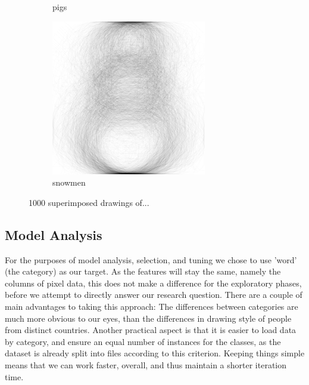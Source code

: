 \documentclass[a4paper, twocolumn]{article}
\begin{document}
\begin{figure}[H]
\begin{subfigure}{.33\columnwidth}
      \caption{pigs}
      \label{fig:pigs}
    \end{subfigure}%
    \begin{subfigure}{.33\columnwidth}
      \centering
      \includegraphics[width=.9\textwidth]{figures/snowman.png}
      \caption{snowmen}
      \label{fig:snowmen}
    \end{subfigure}
    \caption{1000 superimposed drawings of...}
    \label{fig:superimposed}
    \end{figure}

\subsection{Model Analysis\label{sec:Model Analysis}}
For the purposes of model analysis, selection, and tuning we chose to use 'word' (the category) as our target. As the features will stay the same, namely the columns of pixel data, this does not make a difference for the exploratory phases, before we attempt to directly answer our research question. There are a couple of main advantages to taking this approach: The differences between categories are much more obvious to our eyes, than the differences in drawing style of people from distinct countries. Another practical aspect is that it is easier to load data by category, and ensure an equal number of instances for the classes, as the dataset is already split into files according to this criterion. Keeping things simple means that we can work faster, overall, and thus maintain a shorter iteration time.
\end{document}
